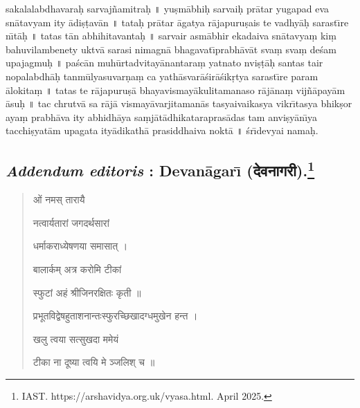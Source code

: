 \documentclass[a4paper, 11pt, oneside, french]{article}
\begin{document}
sakalalabdhavara\d{h} sarvaj\~{n}amitra\d{h} \texthindi{॥} yu\d{s}m\={a}bhi\d{h} sarvai\d{h} pr\={a}tar yugapad eva sn\={a}tavyam ity \={a}di\d{s}\d{t}av\={a}n \texthindi{॥} tata\d{h} pr\={a}tar \={a}gatya r\={a}japuru\d{s}ais te vadhy\={a}\d{h} sarast\={\i}re n\={\i}t\={a}\d{h} \texthindi{॥} tatas t\={a}n abhihitavanta\d{h} \texthindi{॥} sarvair asm\={a}bhir ekadaiva sn\={a}tavya\d{m} ki\d{m} bahuvilambenety uktv\={a} sarasi nimagn\={a} bhagavat\={\i}prabh\={a}v\={a}t sva\d{m} sva\d{m} de\'{s}am upajagmu\d{h} \texthindi{॥} pa\'{s}c\={a}n muh\={u}rtadvitay\={a}nantara\d{m} yatnato nvi\d{s}\d{t}\={a}\d{h} santas tair nopalabdh\={a}\d{h} tanm\={u}lyasuvar\d{n}a\d{m} ca yath\={a}svar\={a}\'{s}ir\={a}\'{s}ik\d{r}tya sarast\={\i}re param \={a}lokita\d{m} \texthindi{॥} tatas te r\={a}japuru\d{s}\={a} bhayavismay\={a}kulitamanaso r\={a}j\={a}na\d{m} vij\~{n}\={a}pay\={a}m \={a}su\d{h} \texthindi{॥} tac chrutv\={a} sa r\={a}j\={a} vismay\={a}varjitaman\={a}s tasyaivaikasya vikr\={\i}tasya bhik\d{s}or aya\d{m} prabh\={a}va ity abhidh\={a}ya sa\d{m}j\={a}t\={a}dhikatarapras\={a}das tam anvi\d{s}y\={a}n\={\i}ya tacchi\d{s}yat\={a}m upagata ity\={a}dikath\={a} prasiddhaiva nokt\={a} \texthindi{॥} \'{s}r\={\i}devyai nama\d{h}.
\clearpage
\subsection[\emph{Addendum editoris} : Devan\={a}gar\={\i} \texthindi{(देवनागरी)}.]{\emph{Addendum editoris} : Devan\={a}gar\={\i} (\texthindi{देवनागरी}).\footnote{IAST. https://arshavidya.org.uk/vyasa.html. April 2025.}}
\begin{quotation}
\texthindi{ओं नमस् तारायै}

\bigskip

\texthindi{नत्वार्यतारां जगदर्थसारां}

\texthindi{धर्माकराध्येषणया समासात् ।}

\texthindi{बालार्कम् अत्र करोमि टीकां}

\texthindi{स्फुटां अहं श्रीजिनरक्षितः कृती ॥}

\bigskip

\texthindi{प्रभूतविद्वेषहुताशनान्तःस्फुरच्छिखादग्धमुखेन हन्त ।}

\texthindi{खलु त्वया सत्सुखदा ममेयं}

\texthindi{टीका ना दूष्या त्वयि मे ञ्जलिश् च ॥}
\end{quotation}
\end{document}
